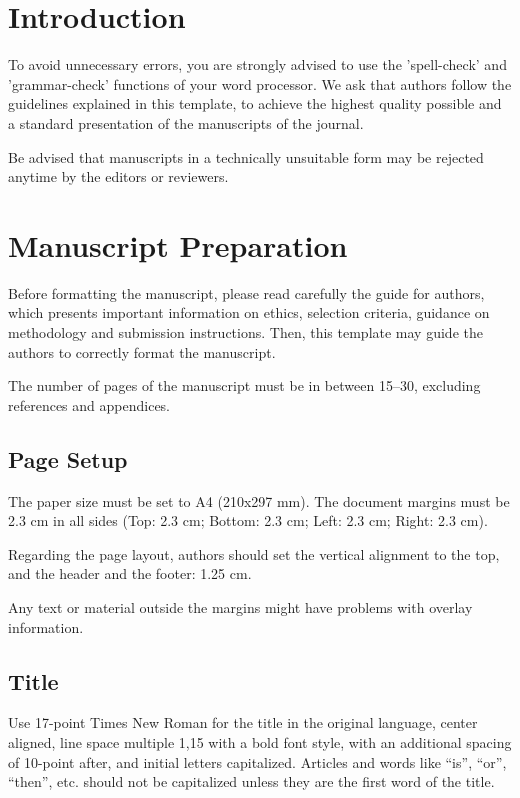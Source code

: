 \documentclass[english, spanish, brazilian]{RBIEarticle} %
\begin{document}
\pagebreak


\section{Introduction}
To avoid unnecessary errors, you are strongly advised to use the 'spell-check' and 'grammar-check' functions of your word processor. We ask that authors follow the guidelines explained in this template, to achieve the highest quality possible and a standard presentation of the manuscripts of the journal.

Be advised that manuscripts in a technically unsuitable form may be rejected anytime by the editors or reviewers.


\section{Manuscript Preparation}
Before formatting the manuscript, please read carefully the guide for authors, which presents important information on ethics, selection criteria, guidance on methodology and submission instructions. Then, this template may guide the authors to correctly format the manuscript.

The number of pages of the manuscript must be in between 15--30, excluding references and appendices.


\subsection{Page Setup}
The paper size must be set to A4 (210x297 mm). The document margins must be 2.3 cm in all sides (Top: 2.3 cm; Bottom: 2.3 cm; Left: 2.3 cm; Right: 2.3 cm).

Regarding the page layout, authors should set the vertical alignment to the top, and the header and the footer: 1.25 cm.

Any text or material outside the margins might have problems with overlay information.


\subsection{Title}
Use 17-point Times New Roman for the title in the original language, center aligned, line space multiple 1,15 with a bold font style, with an additional spacing of 10-point after, and initial letters capitalized. Articles and words like ``is'', ``or'', ``then'', etc. should not be capitalized unless they are the first word of the title.
\end{document}

